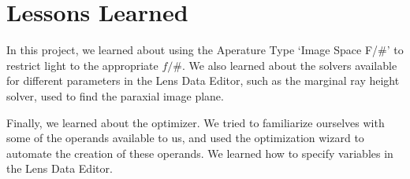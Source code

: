 \documentclass[10pt,a4paper]{article}
\begin{document}
\pagebreak

\section{Lessons Learned}

In this project, we learned about using the Aperature Type `Image Space F/\#' to restrict light to the appropriate $f/\#$. We also learned about the solvers available for different parameters in the Lens Data Editor, such as the marginal ray height solver, used to find the paraxial image plane.

Finally, we learned about the optimizer. We tried to familiarize ourselves with some of the operands available to us, and used the optimization wizard to automate the creation of these operands. We learned how to specify variables in the Lens Data Editor.
	
\end{document}

